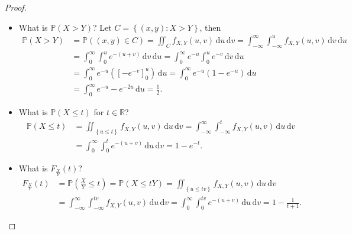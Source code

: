 \begin{proof}
    \hfill 
    \begin{itemize}
        \item [(a)] What is \(\mathbb{P} (X > Y)\)? Let \(C = \left\{ (x, y): X > Y \right\} \), then 
        \begin{align*}
            \mathbb{P} (X > Y) &= \mathbb{P} ((x, y) \in C) = \iint_C f_{X, Y}(u, v) \, \mathrm{d} u \, \mathrm{d} v = \int _{-\infty }^{\infty } \int _{-\infty }^u f_{X, Y} (u, v) \, \mathrm{d} v \, \mathrm{d} u \\
            &= \int _0^{\infty } \int _0^u e^{-(u+v)} \, \mathrm{d} v \, \mathrm{d} u = \int _0^{\infty } e^{-u} \int _0^u e^{-v} \, \mathrm{d} v \, \mathrm{d} u \\
            &= \int _0^{\infty } e^{-u} \left( \left[ -e^{-v} \right]_0^u  \right) \, \mathrm{d} u = \int _0^{\infty} e^{-u} \left( 1 - e^{-u} \right) \, \mathrm{d} u \\
            &= \int _0^{\infty} e^{-u} - e^{-2 u} \, \mathrm{d} u = \frac{1}{2}.          
        \end{align*}
        \item [(b)] What is \(\mathbb{P} (X \le t)\) for \(t \in \mathbb{R}\)? 
        \begin{align*}
            \mathbb{P} (X \le t) &= \iint_{\left\{ u \le t \right\} } f_{X, Y}(u, v) \, \mathrm{d} u \, \mathrm{d} v = \int _{-\infty }^{\infty} \int _{-\infty }^t f_{X, Y}(u, v) \, \mathrm{d} u \, \mathrm{d} v \\
            &= \int _0^{\infty} \int _0^t e^{-(u + v)} \, \mathrm{d} u \, \mathrm{d} v = 1 - e^{-t}.    
        \end{align*}
        \item [(c)] What is \(F_{\frac{X}{Y}} (t)\)? 
        \begin{align*}
            F_{\frac{X}{Y}}(t) &= \mathbb{P} \left( \frac{X}{Y} \le t \right) = \mathbb{P} (X \le tY) = \iint_{\left\{ u \le tv \right\} } f_{X, Y} (u, v) \, \mathrm{d} u \, \mathrm{d} v \\
            &= \int_{-\infty }^{\infty} \int _{-\infty }^{tv} f_{X, Y}(u, v) \, \mathrm{d} u \, \mathrm{d} v = \int_{0}^{\infty} \int _{0}^{tv} e^{-(u + v)} \, \mathrm{d} u \, \mathrm{d} v = 1 - \frac{1}{t+1}.    
        \end{align*}
    \end{itemize}
\end{proof}